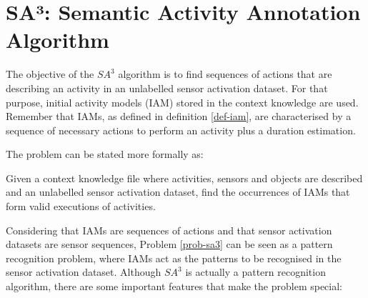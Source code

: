 \section{SA³: Semantic Activity Annotation Algorithm}
\label{sec:clustering:sa3}

The objective of the $SA^3$ algorithm is to find sequences of actions that are describing an activity in an unlabelled sensor activation dataset. For that purpose, initial activity models (IAM) stored in the context knowledge are used. Remember that IAMs, as defined in definition \ref{def-iam}, are characterised by a sequence of necessary actions to perform an activity plus a duration estimation. 

The problem can be stated more formally as:

\begin{problem}[$SA^3$]
\label{prob-sa3}
 Given a context knowledge file where activities, sensors and objects are described and an unlabelled sensor activation dataset, find the occurrences of IAMs that form valid executions of activities.
\end{problem}

Considering that IAMs are sequences of actions and that sensor activation datasets are sensor sequences, Problem \ref{prob-sa3} can be seen as a pattern recognition problem, where IAMs act as the patterns to be recognised in the sensor activation dataset. Although $SA^3$ is actually a pattern recognition algorithm, there are some important features that make the problem special:

